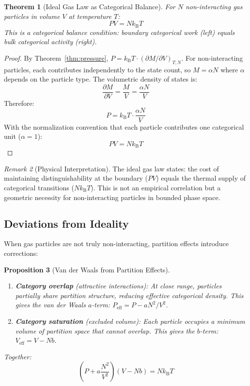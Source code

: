 \documentclass[twocolumn,10pt,a4paper]{article}
\theoremstyle{plain}
\newtheorem{theorem}{Theorem}[section]
\newtheorem{proposition}[theorem]{Proposition}
\theoremstyle{definition}
\theoremstyle{remark}
\newtheorem{remark}[theorem]{Remark}
\newcommand{\kB}{k_{\mathrm{B}}}
\begin{document}
\begin{theorem}[Ideal Gas Law as Categorical Balance]
\label{thm:ideal_gas}
For $N$ non-interacting gas particles in volume $V$ at temperature $T$:
\begin{equation}
\boxed{PV = N\kB T}
\end{equation}
This is a categorical balance condition: boundary categorical work (left) equals bulk categorical activity (right).
\end{theorem}

\begin{proof}
By Theorem~\ref{thm:pressure}, $P = \kB T \cdot (\partial M/\partial V)_{T,N}$. For non-interacting particles, each contributes independently to the state count, so $M = \alpha N$ where $\alpha$ depends on the particle type. The volumetric density of states is:
\begin{equation}
    \frac{\partial M}{\partial V} = \frac{M}{V} = \frac{\alpha N}{V}
\end{equation}
Therefore:
\begin{equation}
    P = \kB T \cdot \frac{\alpha N}{V}
\end{equation}
With the normalization convention that each particle contributes one categorical unit ($\alpha = 1$):
\begin{equation}
    PV = N\kB T
\end{equation}
\end{proof}

\begin{remark}[Physical Interpretation]
The ideal gas law states: the cost of maintaining distinguishability at the boundary ($PV$) equals the thermal supply of categorical transitions ($N\kB T$). This is not an empirical correlation but a geometric necessity for non-interacting particles in bounded phase space.
\end{remark}

\subsection{Deviations from Ideality}

When gas particles are not truly non-interacting, partition effects introduce corrections:

\begin{proposition}[Van der Waals from Partition Effects]
\label{prop:vdw}
\begin{enumerate}
    \item \textbf{Category overlap} (attractive interactions): At close range, particles partially share partition structure, reducing effective categorical density. This gives the van der Waals $a$-term: $P_{\mathrm{eff}} = P - a N^2/V^2$.
    \item \textbf{Category saturation} (excluded volume): Each particle occupies a minimum volume of partition space that cannot overlap. This gives the $b$-term: $V_{\mathrm{eff}} = V - Nb$.
\end{enumerate}
Together:
\begin{equation}
    \left(P + a\frac{N^2}{V^2}\right)(V - Nb) = N\kB T
\end{equation}
\end{proposition}
\end{document}
